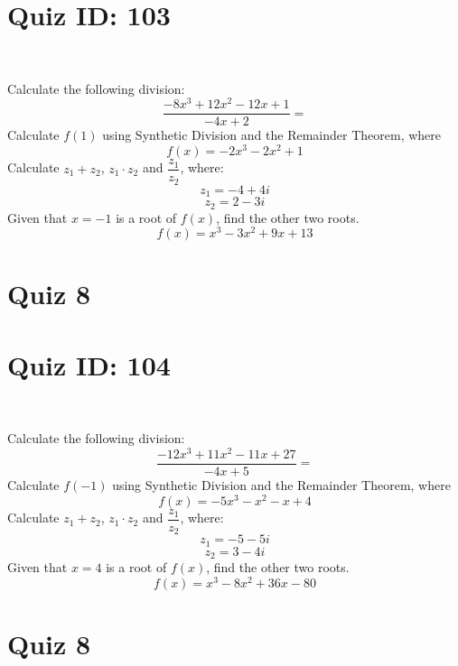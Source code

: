 \documentclass{exam}
\begin{document}
\section*{Quiz ID: 103}
\vspace{0.5cm}\
\vspace{1cm}\
\begin{questions}
\question Calculate the following division:\[\dfrac{
-8x^3 + 12x^2 - 12x + 1}{
-4x + 2}=\] \makeemptybox{\stretch{2}}
\question Calculate $f(1)$ using Synthetic Division and the Remainder Theorem, where\[f(x) = 
-2x^3 - 2x^2 + 1\]
\newpage\question Calculate $z_1+z_2$, $z_1\cdot z_2$ and $\dfrac{z_1}{z_2}$, where:\[z_1=-4+4\mathit{i}\]\[z_2=2-3\mathit{i}\]
\question Given that $x=-1$ is a root of $f(x)$, find the other two roots.\[f(x)=
x^3 - 3x^2 + 9x + 13\]\makeemptybox{\stretch{1}}
\end{questions}\newpage
\newpage
\section*{Quiz 8}
\section*{Quiz ID: 104}
\vspace{0.5cm}\
\vspace{1cm}\
\begin{questions}
\question Calculate the following division:\[\dfrac{
-12x^3 + 11x^2 - 11x + 27}{
-4x + 5}=\] 
\question Calculate $f(-1)$ using Synthetic Division and the Remainder Theorem, where\[f(x) = 
-5x^3 - x^2 - x + 4\]
\newpage\question Calculate $z_1+z_2$, $z_1\cdot z_2$ and $\dfrac{z_1}{z_2}$, where:\[z_1=-5-5\mathit{i}\]\[z_2=3-4\mathit{i}\]\makeemptybox{\stretch{1}}
\question Given that $x=4$ is a root of $f(x)$, find the other two roots.\[f(x)=
x^3 - 8x^2 + 36x - 80\]\makeemptybox{\stretch{1}}
\end{questions}\newpage
\newpage
\section*{Quiz 8}
\end{document}
